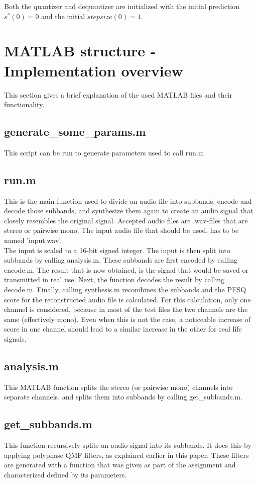 \documentclass[a4paper]{article}
\begin{document}
Both the quantizer and dequantizer are initialized with the initial prediction $s^*(0) = 0$ and the initial $stepsize(0) = 1$.

\section{MATLAB structure - Implementation overview}
This section gives a brief explanation of the used MATLAB files and their functionality.

\subsection{generate\_some\_params.m}
This script can be run to generate parameters used to call run.m

\subsection{run.m}
This is the main function used to divide an audio file into subbands, encode and decode those subbands, and synthesize them again to create an audio signal that closely resembles the original signal. Accepted audio files are .wav-files that are stereo or pairwise mono. The input audio file that should be used, has to be named 'input.wav'.\\

The input is scaled to a 16-bit signed integer. The input is then split into subbands by calling analysis.m. These subbands are first encoded by calling encode.m. The result that is now obtained, is the signal that would be saved or transmitted in real use. Next, the function decodes the result by calling decode.m. Finally, calling synthesis.m recombines the subbands and the PESQ score for the reconstructed audio file is calculated. For this calculation, only one channel is considered, because in most of the test files the two channels are the same (effectively mono). Even when this is not the case, a noticeable increase of score in one channel should lead to a similar increase in the other for real life signals.

\subsection{analysis.m}
This MATLAB function splits the stereo (or pairwise mono) channels into separate channels, and splits them into subbands by calling get\_subbands.m.

\subsection{get\_subbands.m}
This function recursively splits an audio signal into its subbands. It does this by applying polyphase QMF filters, as explained earlier in this paper. These filters are generated with a function that was given as part of the assignment and characterized defined by its parameters.\\
\end{document}
